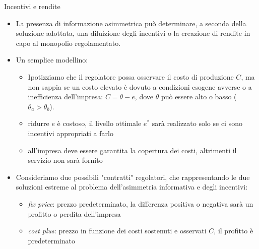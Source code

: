 \documentclass[aspectratio=64,11pt]{beamer}
\begin{document}
\begin{frame}{Incentivi e rendite}
\begin{itemize}
\item La presenza di informazione asimmetrica può determinare, a seconda della
soluzione adottata, una \alert{diluizione degli incentivi} o la creazione di
\alert{rendite} in capo al monopolio regolamentato.
\item Un semplice modellino:
\begin{itemize}
\item Ipotizziamo che il regolatore possa osservare il costo di produzione $C$, ma
non sappia se un costo elevato è dovuto a condizioni esogene avverse o a
inefficienza dell'impresa: $C=\theta-e$, dove $\theta$ può essere alto
o basso ($\theta_a>\theta_b$).
\item ridurre $e$ è costoso, il livello ottimale $e^*$ sarà realizzato solo se
ci sono incentivi appropriati a farlo
\item all'impresa deve essere garantita la copertura dei costi, altrimenti il
servizio non sarà fornito
\end{itemize}
\item Consideriamo due possibili "contratti" regolatori, che rappresentando le due
soluzioni estreme al problema dell'asimmetria informativa e degli incentivi:
\begin{itemize}
\item \emph{fix price}: prezzo predeterminato, la differenza positiva o negativa sarà
un profitto o perdita dell'impresa
\item \emph{cost plus}: prezzo in funzione dei costi sostenuti e osservati $C$, il
profitto è predeterminato
\end{itemize}
\end{itemize}
\end{frame}
\end{document}
